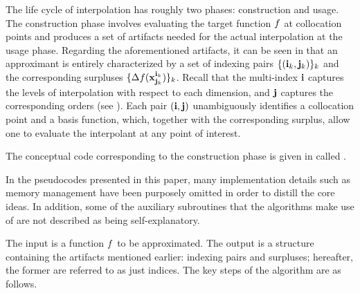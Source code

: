 The life cycle of interpolation has roughly two phases: construction and usage.
The construction phase involves evaluating the target function $f$ at
collocation points and produces a set of artifacts needed for the actual
interpolation at the usage phase. Regarding the aforementioned artifacts, it can
be seen in  that an approximant is entirely
characterized by a set of indexing pairs $\{ (\mathbf{i}_k, \mathbf{j}_k) \}_k$ and the
corresponding surpluses $\{ \Delta f(\mathbf{x}^{\mathbf{i}_k}_{\mathbf{j}_k}) \}_k$. Recall that the
multi-index $\mathbf{i}$ captures the levels of interpolation with respect to each
dimension, and $\mathbf{j}$ captures the corresponding orders (see
). Each pair $(\mathbf{i}, \mathbf{j})$ unambiguously identifies a
collocation point and a basis function, which, together with the corresponding
surplus, allow one to evaluate the interpolant at any point of interest.


The conceptual code corresponding to the construction phase is given in
 called .

\begin{remark}
In the pseudocodes presented in this paper, many implementation details such as
memory management have been purposely omitted in order to distill the core
ideas. In addition, some of the auxiliary subroutines that the algorithms make
use of are not described as being self-explanatory.
\end{remark}

The input  is a function $f$ to be approximated. The output
 is a structure containing the artifacts mentioned earlier:
indexing pairs and surpluses; hereafter, the former are referred to as just
indices. The key steps of the  algorithm are as follows.

